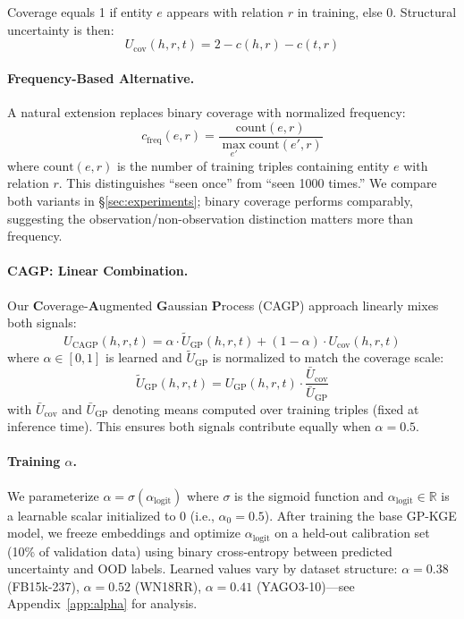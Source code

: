 Coverage equals 1 if entity $e$ appears with relation $r$ in training, else 0.
Structural uncertainty is then:
\begin{equation}
    U_{\text{cov}}(h, r, t) = 2 - c(h, r) - c(t, r)
\end{equation}

\paragraph{Frequency-Based Alternative.}
A natural extension replaces binary coverage with normalized frequency:
\begin{equation}
    c_{\text{freq}}(e, r) = \frac{\text{count}(e, r)}{\max_{e'} \text{count}(e', r)}
\end{equation}
where $\text{count}(e, r)$ is the number of training triples containing entity $e$ with relation $r$.
This distinguishes ``seen once'' from ``seen 1000 times.''
We compare both variants in \S\ref{sec:experiments}; binary coverage performs comparably, suggesting the observation/non-observation distinction matters more than frequency.

\paragraph{CAGP: Linear Combination.}
Our \textbf{C}overage-\textbf{A}ugmented \textbf{G}aussian \textbf{P}rocess (CAGP) approach linearly mixes both signals:
\begin{equation}
    U_{\text{CAGP}}(h, r, t) = \alpha \cdot \tilde{U}_{\text{GP}}(h,r,t) + (1-\alpha) \cdot U_{\text{cov}}(h,r,t)
\end{equation}
where $\alpha \in [0,1]$ is learned and $\tilde{U}_{\text{GP}}$ is normalized to match the coverage scale:
\begin{equation}
    \tilde{U}_{\text{GP}}(h,r,t) = U_{\text{GP}}(h,r,t) \cdot \frac{\bar{U}_{\text{cov}}}{\bar{U}_{\text{GP}}}
\end{equation}
with $\bar{U}_{\text{cov}}$ and $\bar{U}_{\text{GP}}$ denoting means computed over training triples (fixed at inference time). This ensures both signals contribute equally when $\alpha = 0.5$.

\paragraph{Training $\alpha$.}
We parameterize $\alpha = \sigma(\alpha_{\text{logit}})$ where $\sigma$ is the sigmoid function and $\alpha_{\text{logit}} \in \mathbb{R}$ is a learnable scalar initialized to 0 (i.e., $\alpha_0 = 0.5$).
After training the base GP-KGE model, we freeze embeddings and optimize $\alpha_{\text{logit}}$ on a held-out calibration set (10\% of validation data) using binary cross-entropy between predicted uncertainty and OOD labels.
Learned values vary by dataset structure: $\alpha = 0.38$ (FB15k-237), $\alpha = 0.52$ (WN18RR), $\alpha = 0.41$ (YAGO3-10)---see Appendix~\ref{app:alpha} for analysis.

